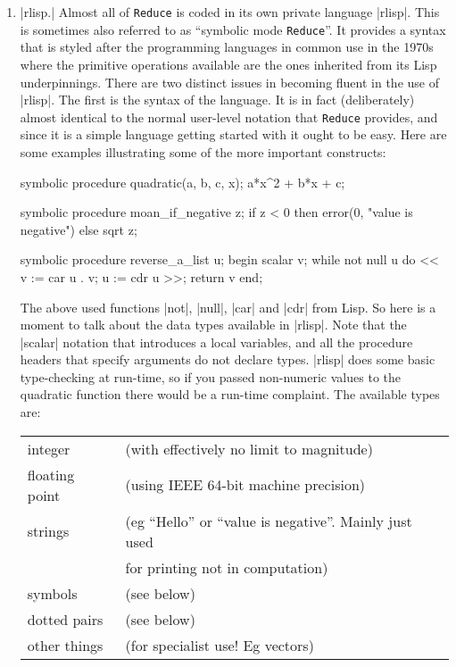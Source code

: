 \documentclass[12pt,twoside,openright]{memoir}
\newcommand{\reduce}{\texttt{Reduce}\xspace}
\begin{document}
\begin{enumerate}
\item |rlisp.| Almost all of \reduce is coded in its own private language
  |rlisp|. This is sometimes also referred to as ``symbolic mode \reduce''. It
  provides a syntax that is styled after the programming languages in common
  use in the 1970s where the primitive operations available are the ones
  inherited from its Lisp underpinnings.  There are two distinct issues in
  becoming fluent in the use of |rlisp|. The first is the syntax of the
  language. It is in fact (deliberately) almost identical to the normal
  user-level notation that \reduce provides, and since it is a simple language
  getting started with it ought to be easy. Here are some examples illustrating
  some of the more important constructs:
\begin{rlispverb}
  symbolic procedure quadratic(a, b, c, x);
     a*x^2 + b*x + c;
\end{rlispverb}

\begin{rlispverb}
  symbolic procedure moan_if_negative z;
  if z < 0 then error(0, "value is negative") else sqrt z;
\end{rlispverb}

\begin{rlispverb}
  symbolic procedure reverse_a_list u;
    begin %
      scalar v; %
      while not null u do
      <<
        v := car u . v;
        u := cdr u
      >>; %
      return v
    end;
\end{rlispverb}

The above used functions |not|, |null|, |car| and |cdr| from Lisp. So here is
a moment to talk about the data types available in |rlisp|. Note that the
|scalar| notation that introduces a local variables, and all the procedure
headers that specify arguments do not declare types. |rlisp| does some basic
type-checking at run-time, so if you passed non-numeric values to the
quadratic function there would be a run-time complaint. The available
types are:

\begin{tabular}{ll}
      integer             &(with effectively no limit to magnitude)\\
      floating point      &(using IEEE 64-bit machine precision)\\
      strings             &(eg ``Hello'' or ``value is negative''. Mainly
			   just used\\
			  & for printing not in computation)\\
      symbols             &(see below)\\
      dotted pairs        &(see below)\\
      other things        &(for specialist use! Eg vectors)
\end{tabular}


\end{enumerate}
\end{document}
